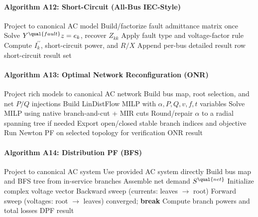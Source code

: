 \paragraph{Algorithm A12: Short-Circuit (All-Bus IEC-Style)}
\begin{algorithmic}[1]
  \State Project to canonical AC model
  \State Build/factorize fault admittance matrix once
    \State Solve \(Y^{\qual{fault}}z=e_k\), recover \(Z_{kk}\)
    \State Apply fault type and voltage-factor rule
    \State Compute \(I_{k}^{\prime\prime}\), short-circuit power, and \(R/X\)
    \State Append per-bus detailed result row
  \EndFor
  \State \Return short-circuit result set
\EndProcedure
\end{algorithmic}

\paragraph{Algorithm A13: Optimal Network Reconfiguration (ONR)}
\begin{algorithmic}[1]
  \State Project rich models to canonical AC network
  \State Build bus map, root selection, and net \(P/Q\) injections
  \State Build LinDistFlow MILP with \(\alpha,P,Q,v,f,t\) variables
  \State Solve MILP using native branch-and-cut + MIR cuts
  \State Round/repair \(\alpha\) to a radial spanning tree if needed
  \State Export open/closed stable branch indices and objective
  \State Run Newton PF on selected topology for verification
  \State \Return ONR result
\EndProcedure
\end{algorithmic}

\paragraph{Algorithm A14: Distribution PF (BFS)}
\begin{algorithmic}[1]
    \State Project to canonical AC system
  \Else
    \State Use provided AC system directly
  \EndIf
  \State Build bus map and BFS tree from in-service branches
  \State Assemble net demand \(S^{\qual{net}}\)
  \State Initialize complex voltage vector
    \State Backward sweep (currents: leaves \(\rightarrow\) root)
    \State Forward sweep (voltages: root \(\rightarrow\) leaves)
     \State converged; \textbf{break} \EndIf
  \EndFor
  \State Compute branch powers and total losses
  \State \Return DPF result
\EndProcedure
\end{algorithmic}

